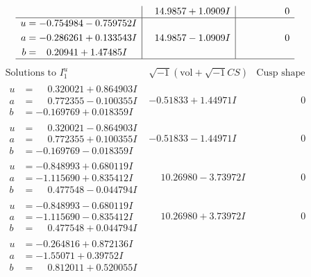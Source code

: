 \documentclass[1p]{elsarticle_modified}
\theoremstyle{definition}
\newcommand{\I}{\sqrt{-1}}
\begin{document}
$$\begin{array}{c|c|c}
 & \phantom{-}14.9857 + 1.0909 I & \phantom{-0.000000 } 0 \\ \hline\begin{aligned}
u &= -0.754984 - 0.759752 I \\
a &= -0.286261 + 0.133543 I \\
b &= \phantom{-}0.20941 + 1.47485 I\end{aligned}
 & \phantom{-}14.9857 - 1.0909 I & \phantom{-0.000000 } 0\\
 \hline 
 \end{array}$$\newpage$$\begin{array}{c|c|c}  
\text{Solutions to }I^u_{1}& \I (\text{vol} + \sqrt{-1}CS) & \text{Cusp shape}\\
 \hline 
\begin{aligned}
u &= \phantom{-}0.320021 + 0.864903 I \\
a &= \phantom{-}0.772355 - 0.100355 I \\
b &= -0.169769 + 0.018359 I\end{aligned}
 & -0.51833 + 1.44971 I & \phantom{-0.000000 } 0 \\ \hline\begin{aligned}
u &= \phantom{-}0.320021 - 0.864903 I \\
a &= \phantom{-}0.772355 + 0.100355 I \\
b &= -0.169769 - 0.018359 I\end{aligned}
 & -0.51833 - 1.44971 I & \phantom{-0.000000 } 0 \\ \hline\begin{aligned}
u &= -0.848993 + 0.680119 I \\
a &= -1.115690 + 0.835412 I \\
b &= \phantom{-}0.477548 - 0.044794 I\end{aligned}
 & \phantom{-}10.26980 - 3.73972 I & \phantom{-0.000000 } 0 \\ \hline\begin{aligned}
u &= -0.848993 - 0.680119 I \\
a &= -1.115690 - 0.835412 I \\
b &= \phantom{-}0.477548 + 0.044794 I\end{aligned}
 & \phantom{-}10.26980 + 3.73972 I & \phantom{-0.000000 } 0 \\ \hline\begin{aligned}
u &= -0.264816 + 0.872136 I \\
a &= -1.55071 + 0.39752 I \\
b &= \phantom{-}0.812011 + 0.520055 I\end{aligned}

\end{array}$$
\end{document}
